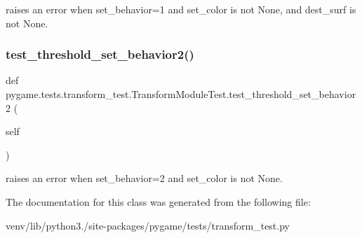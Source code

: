 \begin{DoxyVerb}raises an error when set_behavior=1
and set_color is not None,
and dest_surf is not None.
\end{DoxyVerb}
 \mbox{\label{classpygame_1_1tests_1_1transform__test_1_1_transform_module_test_a71ef5f0fb5ead9187ed56eeaae8ff61b}} 
\subsubsection{\texorpdfstring{test\+\_\+threshold\+\_\+set\+\_\+behavior2()}{test\_threshold\_set\_behavior2()}}
{\footnotesize\ttfamily def pygame.\+tests.\+transform\+\_\+test.\+Transform\+Module\+Test.\+test\+\_\+threshold\+\_\+set\+\_\+behavior2 (\begin{DoxyParamCaption}\item[{}]{self }\end{DoxyParamCaption})}

\begin{DoxyVerb}raises an error when set_behavior=2 and set_color is not None.
\end{DoxyVerb}
 

The documentation for this class was generated from the following file\+:\begin{DoxyCompactItemize}
\item 
venv/lib/python3./site-\/packages/pygame/tests/transform\+\_\+test.\+py\end{DoxyCompactItemize}
